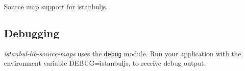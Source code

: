 \href{https://travis-ci.org/istanbuljs/istanbuljs}{\tt }

Source map support for istanbuljs.

\subsection*{Debugging}

{\itshape istanbul-\/lib-\/source-\/maps} uses the \href{https://www.npmjs.com/package/debug}{\tt debug} module. Run your application with the environment variable {\ttfamily D\+E\+B\+UG=istanbuljs}, to receive debug output. 